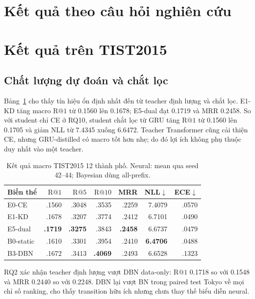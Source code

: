 \documentclass[runningheads]{llncs}
\makeatletter
\newcommand{\Rone}{\mathrm{R@1}}
\newcommand{\Rfive}{\mathrm{R@5}}
\newcommand{\Rten}{\mathrm{R@10}}
\makeatother
\begin{document}
\section{Kết quả theo câu hỏi nghiên cứu}
{\sloppy}

\iffalse
\section{Kết quả trên TIST2015}

\subsection{Chất lượng dự đoán và chắt lọc}

Bảng~\ref{tab:tist-main} cho thấy tín hiệu ổn định nhất đến từ teacher định lượng và chắt lọc. E1-KD tăng macro $\Rone$ từ 0.1560 lên 0.1678; E5-dual đạt 0.1719 và MRR 0.2458. So với student chỉ CE ở RQ10, student chắt lọc từ GRU tăng $\Rone$ từ 0.1560 lên 0.1705 và giảm NLL từ 7.4345 xuống 6.6472. Teacher Transformer cũng cải thiện CE, nhưng GRU-distilled có macro tốt hơn nhẹ; do đó lợi ích không phụ thuộc duy nhất vào một teacher.

\begin{table}[H]
\caption{Kết quả macro TIST2015 12 thành phố. Neural: mean qua seed 42--44; Bayesian dùng all-prefix.}
\label{tab:tist-main}
\centering
\small
\begin{tabular}{@{}lrrrrrr@{}}
\toprule
Biến thể & $\Rone$ & $\Rfive$ & $\Rten$ & MRR & NLL$\downarrow$ & ECE$\downarrow$\\
\midrule
E0-CE & .1560 & .3048 & .3535 & .2259 & 7.4079 & .0570\\
E1-KD & .1678 & .3207 & .3774 & .2412 & 6.7101 & .0490\\
E5-dual & \textbf{.1719} & \textbf{.3275} & .3843 & \textbf{.2458} & 6.6737 & .0479\\
\midrule
B0-static & .1610 & .3301 & .3954 & .2410 & \textbf{6.4706} & .0488\\
B3-DBN & .1672 & .3413 & \textbf{.4069} & .2493 & 6.6528 & .1323\\
\bottomrule
\end{tabular}
\end{table}

RQ2 xác nhận teacher định lượng vượt DBN data-only: $\Rone$ 0.1718 so với 0.1548 và MRR 0.2440 so với 0.2248. DBN lại vượt BN trong paired test Tokyo về mọi chỉ số ranking, cho thấy transition hữu ích nhưng chưa thay thế biểu diễn neural.
\end{document}
